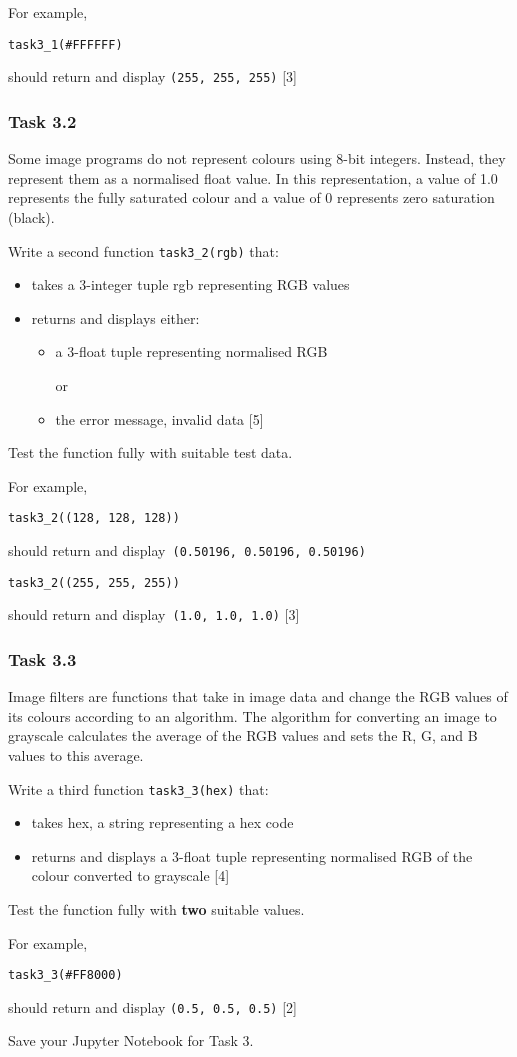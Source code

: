For example, 

\texttt{task3\_1(\textquotedbl\#FFFFFF\textquotedbl ) }

should return and display \texttt{(255, 255, 255)}\hfill{} {[}3{]}

\subsubsection*{Task 3.2 }

Some image programs do not represent colours using 8-bit integers.
Instead, they represent them as a normalised float value. In this
representation, a value of 1.0 represents the fully saturated colour
and a value of 0 represents zero saturation (black). 

Write a second function \texttt{task3\_2(rgb)} that: 
\begin{itemize}
\item takes a 3-integer tuple rgb representing RGB values 
\item returns and displays either: 
\begin{itemize}
\item a 3-float tuple representing normalised RGB 

or 
\item the error message, \textquotedbl invalid data\textquotedbl{} \hfill{}{[}5{]}
\end{itemize}
\end{itemize}
Test the function fully with suitable test data. 

For example, 

\texttt{task3\_2((128, 128, 128))} 

should return and display\texttt{ (0.50196, 0.50196, 0.50196) }

\texttt{task3\_2((255, 255, 255)) }

should return and display\texttt{ (1.0, 1.0, 1.0)}\hfill{} {[}3{]}

\subsubsection*{Task 3.3 }

Image filters are functions that take in image data and change the
RGB values of its colours according to an algorithm. The algorithm
for converting an image to grayscale calculates the average of the
RGB values and sets the R, G, and B values to this average. 

Write a third function \texttt{task3\_3(hex)} that:
\begin{itemize}
\item takes hex, a string representing a hex code 
\item returns and displays a 3-float tuple representing normalised RGB of
the colour converted to grayscale \hfill{}{[}4{]}
\end{itemize}
Test the function fully with \textbf{two} suitable values.

For example, 

\texttt{task3\_3(\textquotedbl\#FF8000\textquotedbl ) }

should return and display \texttt{(0.5, 0.5, 0.5)}\hfill{} {[}2{]}

Save your Jupyter Notebook for Task 3.